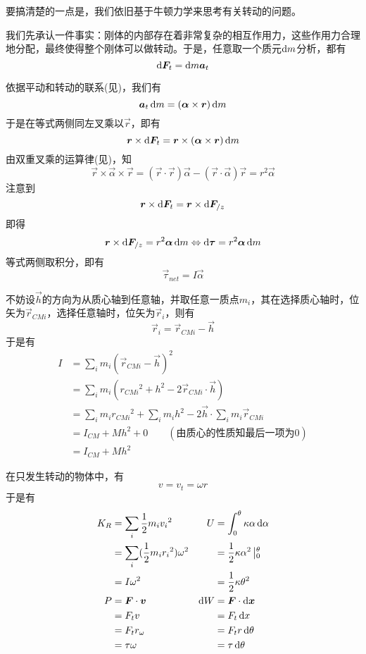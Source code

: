 \chapter[转动动力学]{}
\begin{prove}[Concepts in Dynamics\qquad$\vec{\tau}_{net}=I\vec{\alpha}$]
	要搞清楚的一点是，我们依旧基于牛顿力学来思考有关转动的问题。
	
	我们先承认一件事实：刚体的内部存在着非常复杂的相互作用力，这些作用力合理地分配，最终使得整个刚体可以做转动。于是，任意取一个质元$\dif m$分析，都有\[\dif \vec{F}_t=\dif m\vec{a}_t\]
	
	依据平动和转动的联系(见)，我们有
	\[\vec{a}_t\dif m=(\vec{\alpha}\times\vec{r})\dif m\]
	于是在等式两侧同左叉乘以$\vec{r}$，即有
	\[\vec{r}\times\dif\vec{F}_t= \vec{r}\times(\vec{\alpha}\times\vec{r})\dif m\]
	由双重叉乘的运算律(见)，知
	\[\vec{r}\times\vec{\alpha}\times\vec{r}=(\vec{r}\cdot\vec{r})\vec{\alpha}-(\vec{r}\cdot\vec{\alpha})\vec{r}=r^2\vec{\alpha}\]
	注意到
	\[\vec{r}\times\dif\vec{F}_t=\vec{r}\times\dif\vec{F}_{/z}\]
	即得
	\[\vec{r}\times\dif\vec{F}_{/z}=r^2\vec{\alpha}\dif m\Leftrightarrow\dif\vec{\tau}=r^2\vec{\alpha}\dif m\]
	等式两侧取积分，即有
	\[\vec{\tau}_{net}=I\vec{\alpha}\]
\end{prove}
\newpage
\begin{prove}[\itr{Parallel Axis Theorem}{平行轴定理}\qquad$I=I_{CM}+Mh^2$]
	不妨设$\vec{h}$的方向为从质心轴到任意轴，并取任意一质点$m_i$，其在选择质心轴时，位矢为$\vec{r}_{CMi}$，选择任意轴时，位矢为$\vec{r}_i$，则有\[\vec{r}_i=\vec{r}_{CMi}-\vec{h}\]
	于是有
	\begin{align*}
		I&=\sum_{i}m_i(\vec{r}_{CMi}-\vec{h})^2\\
		&=\sum_{i}m_i(r_{CMi}{}^2+h^2-2\vec{r}_{CMi}\cdot\vec{h})\\
		&=\sum_{i}m_ir_{CMi}{}^2+\sum_{i}m_ih^2-2\vec{h}\cdot\sum_{i}m_i\vec{r}_{CMi}\\
		&=I_{CM}+Mh^2+0\qquad(\text{由质心的性质知最后一项为0})\\
		&=I_{CM}+Mh^2
	\end{align*}
\end{prove}
\begin{prove}
	在只发生转动的物体中，有\[v=v_t=\omega r\]于是有
	\begin{align*}
		K_R&=\sum_i\dfrac{1}{2}m_iv_i{}^2&U&=\int_0^{\theta}\kappa\alpha\dif\alpha\\
		&=\sum_i(\dfrac{1}{2}m_i r_i{}^2)\omega^2&&=\dfrac{1}{2}\kappa\alpha^2\left|_0^{\theta}\right.\\
		&=I\omega^2&&=\dfrac{1}{2}\kappa\theta^2\\
		P&=\vec{F}\cdot \vec{v}&\dif W&=\vec{F}\cdot\dif \vec{x}\\
		&=F_tv&&=F_t\dif x\\
		&=F_tr_\omega&&=F_tr\dif\theta\\
		&=\tau\omega&&=\tau\dif\theta
	\end{align*}
\end{prove}
